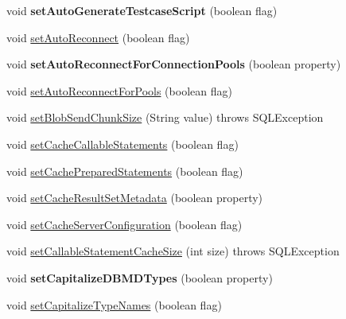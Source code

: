 \begin{DoxyCompactItemize}
void {\bfseries set\+Auto\+Generate\+Testcase\+Script} (boolean flag)
\item 
void \mbox{\hyperlink{interfacecom_1_1mysql_1_1jdbc_1_1_connection_properties_aee554c71f65458593f28c1e7d79846d1}{set\+Auto\+Reconnect}} (boolean flag)
\item 
\mbox{\label{interfacecom_1_1mysql_1_1jdbc_1_1_connection_properties_a254571c601f406ed3d3ae70ea9e9449f}} 
void {\bfseries set\+Auto\+Reconnect\+For\+Connection\+Pools} (boolean property)
\item 
void \mbox{\hyperlink{interfacecom_1_1mysql_1_1jdbc_1_1_connection_properties_afd29baec0fcca703af94fac13342e6bf}{set\+Auto\+Reconnect\+For\+Pools}} (boolean flag)
\item 
void \mbox{\hyperlink{interfacecom_1_1mysql_1_1jdbc_1_1_connection_properties_ab16063397e021c5f18662127d274d4d5}{set\+Blob\+Send\+Chunk\+Size}} (String value)  throws S\+Q\+L\+Exception
\item 
void \mbox{\hyperlink{interfacecom_1_1mysql_1_1jdbc_1_1_connection_properties_ae88f31bc280f1a82f70847797a0a25e7}{set\+Cache\+Callable\+Statements}} (boolean flag)
\item 
void \mbox{\hyperlink{interfacecom_1_1mysql_1_1jdbc_1_1_connection_properties_a990fe5790551ed49878ecc8bceb750a5}{set\+Cache\+Prepared\+Statements}} (boolean flag)
\item 
void \mbox{\hyperlink{interfacecom_1_1mysql_1_1jdbc_1_1_connection_properties_abf45e0839d48fe28bb22d334118f807f}{set\+Cache\+Result\+Set\+Metadata}} (boolean property)
\item 
void \mbox{\hyperlink{interfacecom_1_1mysql_1_1jdbc_1_1_connection_properties_a1c4d96777532b47bfa433c3083557cae}{set\+Cache\+Server\+Configuration}} (boolean flag)
\item 
void \mbox{\hyperlink{interfacecom_1_1mysql_1_1jdbc_1_1_connection_properties_ab22fc3c53b2a21bf9064036222219e22}{set\+Callable\+Statement\+Cache\+Size}} (int size)  throws S\+Q\+L\+Exception
\item 
\mbox{\label{interfacecom_1_1mysql_1_1jdbc_1_1_connection_properties_a5fda036bae2e07202943412f13e36308}} 
void {\bfseries set\+Capitalize\+D\+B\+M\+D\+Types} (boolean property)
\item 
void \mbox{\hyperlink{interfacecom_1_1mysql_1_1jdbc_1_1_connection_properties_a4a5d21e7dfd9bedd2eb10f3169629288}{set\+Capitalize\+Type\+Names}} (boolean flag)

\end{DoxyCompactItemize}
